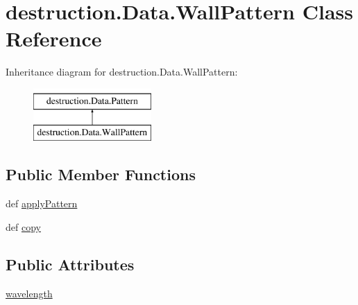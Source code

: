 \hypertarget{classdestruction_1_1_data_1_1_wall_pattern}{\section{destruction.\-Data.\-Wall\-Pattern Class Reference}
\label{classdestruction_1_1_data_1_1_wall_pattern}
}
Inheritance diagram for destruction.\-Data.\-Wall\-Pattern\-:\begin{figure}[H]
\begin{center}
\leavevmode
\includegraphics[height=2.000000cm]{classdestruction_1_1_data_1_1_wall_pattern}
\end{center}
\end{figure}
\subsection*{Public Member Functions}
\begin{DoxyCompactItemize}
\item 
def \hyperlink{classdestruction_1_1_data_1_1_wall_pattern_ad4f2201ca5ad24dead88f27a40a4fdb1}{apply\-Pattern}
\item 
def \hyperlink{classdestruction_1_1_data_1_1_wall_pattern_aeeaafe4104f4671e6e409261ab1c89d4}{copy}
\end{DoxyCompactItemize}
\subsection*{Public Attributes}
\begin{DoxyCompactItemize}
\item 
\hyperlink{classdestruction_1_1_data_1_1_wall_pattern_afeeefce0b575dcb3e7da763ba02c36db}{wavelength}
\end{DoxyCompactItemize}


